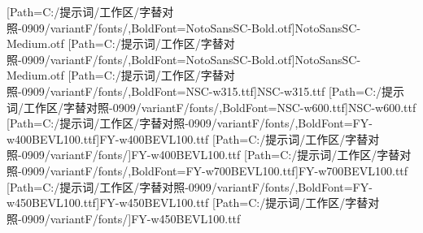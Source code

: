 [Path=C:/提示词/工作区/字替对照-0909/variantF/fonts/,BoldFont=NotoSansSC-Bold.otf]{NotoSansSC-Medium.otf}
[Path=C:/提示词/工作区/字替对照-0909/variantF/fonts/,BoldFont=NotoSansSC-Bold.otf]{NotoSansSC-Medium.otf}
[Path=C:/提示词/工作区/字替对照-0909/variantF/fonts/,BoldFont=NSC-w315.ttf]{NSC-w315.ttf}
[Path=C:/提示词/工作区/字替对照-0909/variantF/fonts/,BoldFont=NSC-w600.ttf]{NSC-w600.ttf}
[Path=C:/提示词/工作区/字替对照-0909/variantF/fonts/,BoldFont=FY-w400BEVL100.ttf]{FY-w400BEVL100.ttf}
\newfontfamily{\libianlat}[Path=C:/提示词/工作区/字替对照-0909/variantF/fonts/]{FY-w400BEVL100.ttf}
[Path=C:/提示词/工作区/字替对照-0909/variantF/fonts/,BoldFont=FY-w700BEVL100.ttf]{FY-w700BEVL100.ttf}
[Path=C:/提示词/工作区/字替对照-0909/variantF/fonts/,BoldFont=FY-w450BEVL100.ttf]{FY-w450BEVL100.ttf}
\newfontfamily{\libianslat}[Path=C:/提示词/工作区/字替对照-0909/variantF/fonts/]{FY-w450BEVL100.ttf}
